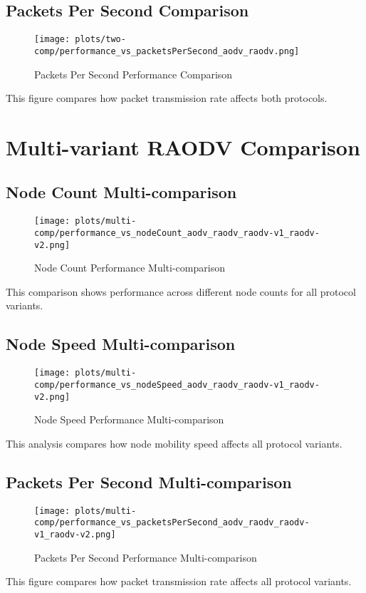 \documentclass{article}
\begin{document}
\subsection{Packets Per Second Comparison}
\begin{figure}[H]
\centering
\texttt{[image: plots/two-comp/performance\_vs\_packetsPerSecond\_aodv\_raodv.png]}
\caption{Packets Per Second Performance Comparison}
\end{figure}
This figure compares how packet transmission rate affects both protocols.
\newpage
\section{Multi-variant RAODV Comparison}
\subsection{Node Count Multi-comparison}
\begin{figure}[H]
\centering
\texttt{[image: plots/multi-comp/performance\_vs\_nodeCount\_aodv\_raodv\_raodv-v1\_raodv-v2.png]}
\caption{Node Count Performance Multi-comparison}
\end{figure}
This comparison shows performance across different node counts for all protocol variants.
\newpage
\subsection{Node Speed Multi-comparison}
\begin{figure}[H]
\centering
\texttt{[image: plots/multi-comp/performance\_vs\_nodeSpeed\_aodv\_raodv\_raodv-v1\_raodv-v2.png]}
\caption{Node Speed Performance Multi-comparison}
\end{figure}
This analysis compares how node mobility speed affects all protocol variants.
\newpage
\subsection{Packets Per Second Multi-comparison}
\begin{figure}[H]
\centering
\texttt{[image: plots/multi-comp/performance\_vs\_packetsPerSecond\_aodv\_raodv\_raodv-v1\_raodv-v2.png]}
\caption{Packets Per Second Performance Multi-comparison}
\end{figure}
This figure compares how packet transmission rate affects all protocol variants.
\end{document}
